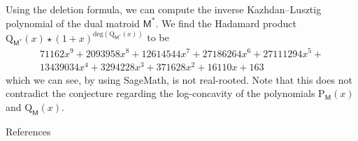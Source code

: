 \documentclass[final]{beamer}
\newlength{\threecolwid}
\newcommand{\M}{\mathsf{M}}
\begin{document}
\begin{frame}[t]
\begin{columns}[t]
\begin{column}{\threecolwid}
\begin{block}{}
\begin{figure}
{
    }
\end{figure}
\vspace{-10mm}
Using the deletion formula,
we can compute the inverse Kazhdan--Lusztig polynomial of the
dual matroid $\M^*$. We find the Hadamard product
\(\mathrm{Q}_{\M^*}(x) \star (1+x)^{\text{deg}(\mathrm{Q}_{\M^*}(x))}\)
to be
\begin{align*}
71162 x^9 + 2093958 x^8 + 12614544 x^7 + 27186264 x^6 +
27111294 x^5 + \\
13439034 x^4 + 3294228 x^3 + 371628 x^2 +
16110 x + 163
\end{align*}
which we can see, by using SageMath, is not real-rooted.
Note that this does not contradict the conjecture regarding
the log-concavity of the polynomials
\(\mathrm{P}_\M(x)\) and \(\mathrm{Q}_\M(x)\).

\end{block}
\vspace{-10mm}
\begin{alertblock}{References}

\printbibliography
\end{alertblock}
\end{column} %

\end{columns} %

\end{frame} %
\end{document}
